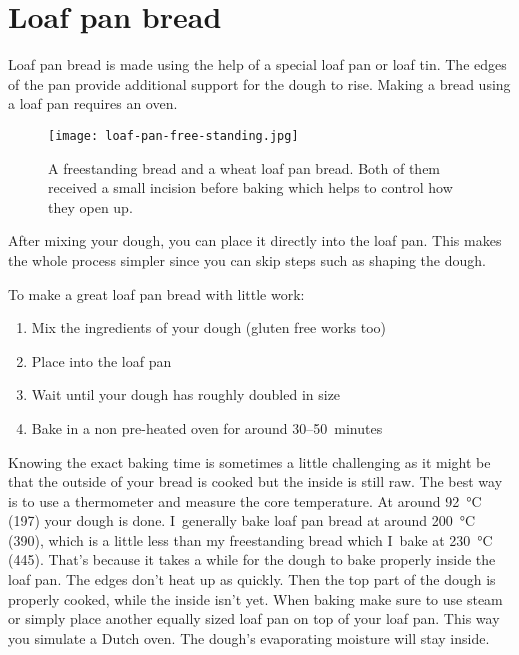 \section{Loaf pan bread}

Loaf pan bread is made using the help of a special loaf pan
or loaf tin. The edges of the pan provide additional support
for the dough to rise. Making a bread using a loaf pan requires
an oven.

\begin{figure}[!htb]
  \texttt{[image: loaf-pan-free-standing.jpg]}
  \caption[Freestanding bread and pan bread]{A freestanding bread and a wheat
      loaf pan bread. Both of them received a small incision before baking
      which helps to control how they open up.}%
  \label{fig:free-standing-loaf-pan}
\end{figure}

After mixing your dough, you can place it directly into the loaf pan.
This makes the whole process simpler since you can skip steps such
as shaping the dough.

To make a great loaf pan bread with little work:

\begin{enumerate}
    \item Mix the ingredients of your dough (gluten free works too)
    \item Place into the loaf pan
    \item Wait until your dough has roughly doubled in size
    \item Bake in a non pre-heated oven for around 30--50~minutes
\end{enumerate}

Knowing the exact baking time is sometimes a little challenging
as it might be that the outside of your bread is cooked but
the inside is still raw. The best way is to use a thermometer
and measure the core temperature. At around  \qty{92}{\degreeCelsius}
(\qty{197}{\degF}) your dough is done. I~generally bake loaf pan bread at
around  \qty{200}{\degreeCelsius} (\qty{390}{\degF}), which is a little less
than my freestanding bread which I~bake at  \qty{230}{\degreeCelsius}
(\qty{445}{\degF}). That's because it takes a while for the dough
to bake properly inside the loaf pan. The edges don't heat up
as quickly. Then the top part of the dough is properly cooked, while
the inside isn't yet. When baking make sure to use steam
or simply place another equally sized loaf pan on top
of your loaf pan. This way you simulate a Dutch oven. The dough's
evaporating moisture will stay inside.

